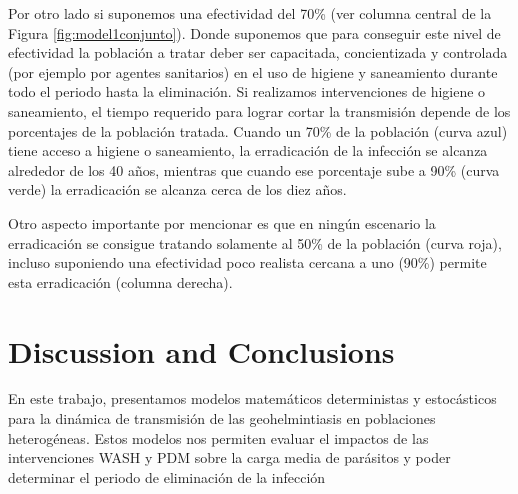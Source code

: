 \documentclass[12pt,a4paper]{article}
\theoremstyle{plain}%
\theoremstyle{definition}
\theoremstyle{remark}
\begin{document}
	Por otro lado si suponemos una efectividad del 70\% (ver columna central de la Figura \ref{fig:model1conjunto}). 
	Donde suponemos que para conseguir este nivel de efectividad la población a tratar deber ser capacitada, concientizada y controlada (por ejemplo por agentes sanitarios) en el uso de higiene y saneamiento durante todo el periodo hasta la eliminación. 
	Si realizamos intervenciones de 
	higiene o saneamiento, el tiempo requerido para lograr cortar la transmisión depende de los porcentajes de la población tratada. Cuando un 70\% de la población (curva azul) tiene acceso a higiene o saneamiento, la erradicación de la infección se alcanza alrededor de los 40 años, mientras que cuando ese porcentaje sube a 90\% (curva verde) la erradicación se alcanza cerca de los diez años.
	
	
	Otro aspecto importante por mencionar es que en ningún escenario la erradicación se consigue tratando solamente al 50\% de la población (curva roja), incluso suponiendo una efectividad poco realista cercana a uno (90\%) permite esta erradicación (columna derecha).  
	
	
	
	\section{Discussion and Conclusions}
	
	
	En este trabajo, presentamos 
	modelos matemáticos deterministas y estocásticos para la dinámica de transmisión de las geohelmintiasis en poblaciones heterogéneas.  Estos modelos nos permiten evaluar el impactos de las intervenciones  WASH y PDM sobre la carga media de parásitos y poder determinar el periodo de eliminación de la infección
	 
	
\end{document}
